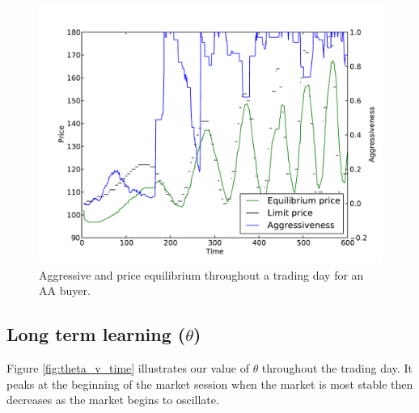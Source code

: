 \documentclass[preprint]{acm_proc_article-sp} %
\begin{document}
\begin{figure}[H] 
\centering
\includegraphics[width=\columnwidth]{graphs_and_stats/graph_aggressiveness_vs_price.pdf}
\caption{Aggressive and price equilibrium throughout a trading day for an AA
  buyer.}
  \label{fig:avtime}
\end{figure}



\subsection{Long term learning ($\theta$)} \label{sec:evaluation_theta}
Figure \ref{fig:theta_v_time} illustrates our value of $\theta$ throughout the
trading day. It peaks at the beginning of the market session when the market is
most stable then decreases as the market begins to oscillate.
\end{document}
